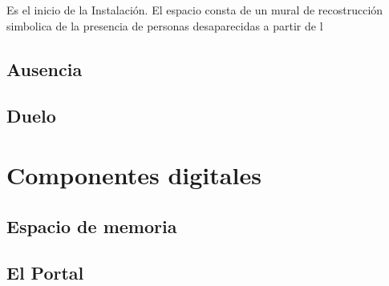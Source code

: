 Es el inicio de la Instalación. El espacio consta de un mural de recostrucción simbolica de la presencia de personas desaparecidas a partir de l

\subsection{Ausencia}

\subsection{Duelo}

\section{Componentes digitales}

\subsection{Espacio de memoria}

\subsection{El Portal}
